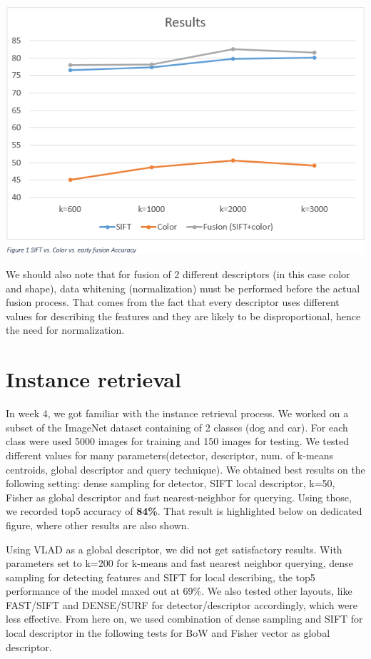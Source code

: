 \documentclass[11pt,a4paper,titlepage,twoside]{scrartcl}
\begin{document}
\centerline{\includegraphics[scale=0.8]{figures/EF.png}}

\par	We should also note that for fusion of 2 different descriptors (in this case color and shape), data whitening (normalization) must be performed before the actual fusion process. That comes from the fact that every descriptor uses different values for describing the features and they are likely to be disproportional, hence the need for normalization.



\section*{Instance retrieval}

\indent    In week 4, we got familiar with the instance retrieval process. We worked on a subset of the ImageNet dataset containing of 2 classes (dog and car). For each class were used 5000 images for training and 150 images for testing. We tested different values for many parameters(detector, descriptor, num. of k-means centroids, global descriptor and query technique). We obtained best results on the following setting: dense sampling for detector, SIFT local descriptor, k=50, Fisher as global descriptor and fast nearest-neighbor for querying. Using those, we recorded top5 accuracy of \textbf{84\%}. That result is highlighted below on dedicated figure, where other results are also shown. 
\par	Using VLAD as a global descriptor, we did not get satisfactory results. With parameters set to k=200 for k-means and fast nearest neighbor querying, dense sampling for detecting features and SIFT for local describing, the top5 performance of the model maxed out at 69\%. We also tested other layouts, like FAST/SIFT and DENSE/SURF for detector/descriptor accordingly, which were less effective. From here on, we used combination of dense sampling and SIFT for local descriptor in the following tests for BoW and Fisher vector as global descriptor.
\end{document}
